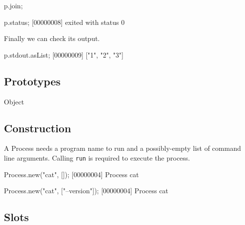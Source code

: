 \begin{urbiscript}
p.join;

p.status;
[00000008] exited with status 0
\end{urbiscript}

\noindent
Finally we can check its output.

\begin{urbiscript}
p.stdout.asList;
[00000009] ["1", "2", "3"]
\end{urbiscript}

\subsection{Prototypes}
\begin{refObjects}
\item[Object]
\end{refObjects}

\subsection{Construction}

A Process needs a program name to run and a possibly-empty list of
command line arguments.  Calling \lstinline|run| is required to
execute the process.

\begin{urbiscript}
Process.new("cat", []);
[00000004] Process cat

Process.new("cat", ["--version"]);
[00000004] Process cat
\end{urbiscript}

\subsection{Slots}

